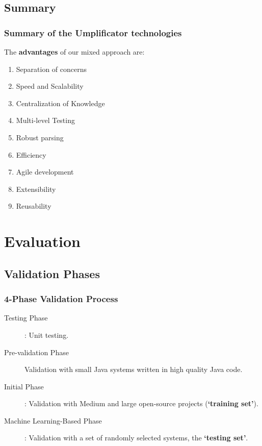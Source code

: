 \documentclass[xcolor=table]{beamer}
\begin{document}
\subsection{Summary} 
\begin{frame}[fragile] 
\frametitle{Summary of the Umplificator technologies}
The \textcolor{important}{\textbf{advantages}} of our mixed approach are: 

\begin{enumerate}
\item Separation of concerns
\item Speed and Scalability 
\item Centralization of Knowledge
\item Multi-level Testing 
\item Robust parsing
\item Efficiency 
\item Agile development 
\item Extensibility 
\item Reusability
\end{enumerate}

\end{frame}

\section{Evaluation}
\subsection{Validation Phases} 
\begin{frame}[fragile] 
\frametitle{4-Phase Validation Process}

\begin{description}

\item[Testing Phase]: Unit testing.

\item[Pre-validation Phase] Validation with small Java systems written in high quality Java code. 

\item[Initial Phase]: Validation with Medium and large  open-source projects (\textbf{`training set'}).

\item[Machine Learning-Based Phase]: Validation with a set of randomly selected systems, the \textbf{`testing set'}.
\end{description}
\end{frame}
\end{document}
